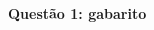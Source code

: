 \documentclass[oneside,12pt]{article}
\begin{document}
\unitlength=8pt

$\begin{array}{ll}
 \ga{fig f}  \phantom{mm} & \ga{fig f}  \\ \\
 \ga{grid F} & \ga{grid F} \\ \\
 \ga{grid F} & \ga{grid F} \\
 \end{array}
$



\newpage


%

{\bf Questão 1: gabarito}
\end{document}
